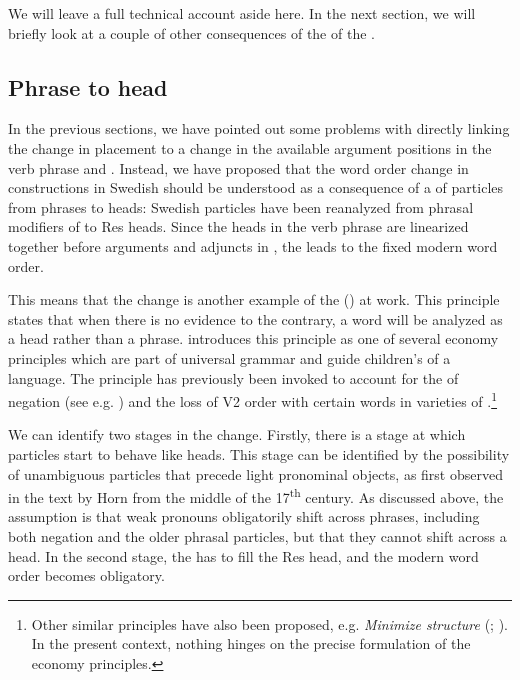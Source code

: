 \documentclass[output=paper]{langscibook}
\begin{document}
We will leave a full technical account aside here. In the next section, we will briefly look at a couple of other consequences of the  of the . 


\subsection{Phrase to head}\label{sec:lalu:6.3}

In the previous sections, we have pointed out some problems with directly linking the change in  placement to a change in the available argument positions in the verb phrase and . Instead, we have proposed that the word order change in  constructions in Swedish should be understood as a consequence of a  of particles from phrases to heads: Swedish particles have been reanalyzed from phrasal modifiers of  to Res heads. Since the heads in the verb phrase are linearized together before arguments and adjuncts in , the  leads to the fixed modern word order. 



This means that the change is another example of the  (\citealt{van_Gelderen2004}) at work. This principle states that when there is no evidence to the contrary, a word will be analyzed as a head rather than a phrase. \citet{van_Gelderen2004} introduces this principle as one of several economy principles which are part of universal grammar and guide children’s  of a language. The principle has previously been invoked to account for the  of negation (see e.g. \citealt{Van_gelderen2008}) and the loss of V2 order with certain  words in varieties of  \citep{WestergaardEtAl2017}.\footnote{Other similar principles have also been proposed, e.g. \textit{Minimize structure} (\citealt{CardinalettiStarke1999}; \citealt{BreitbarthEtAl2020}). In the present context, nothing hinges on the precise formulation of the economy principles.}  



We can identify two stages in the change. Firstly, there is a stage at which particles start to behave like heads. This stage can be identified by the possibility of unambiguous particles that precede light pronominal objects, as first observed in the text by Horn from the middle of the 17\textsuperscript{th} century. As discussed above, the assumption is that weak pronouns obligatorily shift across  phrases, including both negation and the older phrasal particles, but that they cannot shift across a head. In the second stage, the  has to fill the Res head, and the modern word order becomes obligatory. 
\end{document}
